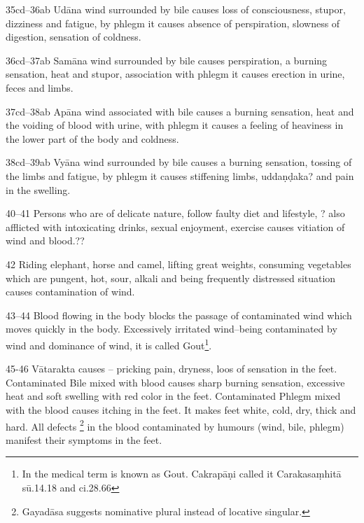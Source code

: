 \begin{translation}
\item[35cd--36ab] Udāna wind surrounded by bile causes loss of 
consciousness, stupor, dizziness and fatigue, by phlegm it causes absence of 
perspiration, slowness of digestion, sensation of coldness.

\item[36cd--37ab] Samāna wind surrounded by bile causes perspiration, a 
burning sensation, heat and stupor, association with phlegm it causes erection 
in 
urine, feces and limbs.  

\item[37cd--38ab] Apāna wind associated with bile causes a burning sensation, 
heat and the voiding of blood with urine, with phlegm it causes a feeling of 
heaviness in the lower part of the body and coldness.

\item[38cd--39ab] Vyāna wind surrounded by bile causes a burning sensation, 
tossing of the limbs and fatigue, by phlegm it causes stiffening limbs, 
uddaṇḍaka? and pain in the swelling.

\item[40--41] Persons who are of delicate nature, follow faulty diet and lifestyle, ? also afflicted with intoxicating drinks, 	sexual enjoyment, exercise causes vitiation of wind and blood.??

\item[42] Riding elephant, horse and camel, lifting great weights, consuming vegetables which are pungent, hot, sour, alkali and being frequently distressed situation causes contamination of wind. 

\item[43--44] Blood flowing in the body blocks the passage of contaminated wind which moves quickly in the body. Excessively irritated wind--being contaminated by wind and dominance of wind, it is called  Gout\footnote{In the medical term  is known as Gout. Cakrapāṇi called it  Carakasaṃhitā sū.14.18 and ci.28.66}.

\item[45-46] Vātarakta causes -- pricking pain, dryness, loos of sensation in the feet. Contaminated Bile mixed with blood causes sharp burning sensation, excessive heat and soft swelling with red color in the feet. Contaminated Phlegm mixed with the blood causes itching in the feet. It makes feet white, cold, dry, thick and hard. All defects \footnote{Gayadāsa suggests  nominative plural instead of locative singular.} in the blood contaminated by humours (wind, bile, phlegm) manifest their symptoms in the feet.


\end{translation}
